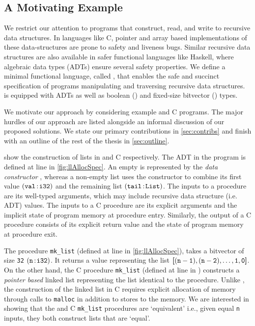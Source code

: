\subsection{A Motivating Example}
\label{sec:motivatingexample}
We restrict our attention to programs that construct, read, and write
to recursive data structures. In languages like C, pointer and array based
implementations of these data-structures are prone to safety and liveness bugs.
Similar recursive data structures are also available in safer functional languages like Haskell,
where algebraic data types (ADTs) \cite{hope} ensure several safety properties.
We define a minimal functional language, called \SpecL{}, that enables the safe
and succinct specification of programs manipulating and traversing recursive data structures.
\SpecL{} is equipped with ADTs as well as boolean () and fixed-size bitvector () types.

We motivate our approach by considering example \SpecL{} and C programs.
The major hurdles of our approach are listed alongside an informal discussion of our proposed solutions.
We state our primary contributions in \cref{sec:contribs} and finish with an outline of
the rest of the thesis in \cref{sec:outline}.



 show the construction of lists in \SpecL{} and C respectively.
The  ADT in the \SpecL{} program is defined at line  in \cref{fig:llAllocSpec}.
An empty  is represented by the {\em data constructor} , whereas a non-empty list uses
the  constructor to combine its first value $({\tt val}{{\,\tt :\!i32}})$ and
the remaining list $({\tt tail}{{\,\tt :\!List}})$.
The inputs to a \SpecL{} procedure are its well-typed arguments, which may include recursive data structure (i.e. ADT) values.
The inputs to a C procedure are its explicit arguments and the implicit state of program memory at procedure entry.
Similarly, the output of a C procedure consists of its explicit return value and the state of program memory at procedure exit.

The \SpecL{} procedure {\tt mk\_list} (defined at line  in \cref{fig:llAllocSpec}), takes
a bitvector of size {\tt 32} $({\tt n}{{\,\tt :\!i32}})$.
It returns a  value representing the list ${\tt \bm{[} (n-1),(n-2),\dots,1,0 \bm{]}}$.
On the other hand, the C procedure {\tt mk\_list} (defined at line  in )
constructs a {\em pointer based} linked list representing the list identical to the \SpecL{} procedure.
Unlike \SpecL{}, the construction of the linked list in C requires explicit allocation of memory through calls to {\tt malloc}
in addition to stores to the memory.
We are interested in showing that the \SpecL{} and C {\tt mk\_list} procedures are `equivalent'
i.e., given equal {\tt n} inputs, they both construct lists that are `equal'.

